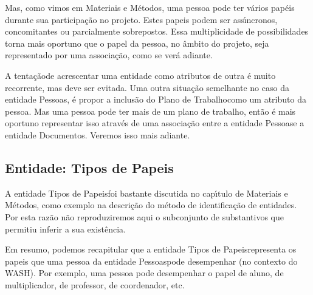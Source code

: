 \documentclass[
12pt,		%
openright,	%
twoside,  %
a4paper,			%
chapter=TITLE,		%
english,			%
french,				%
spanish,			%
brazil				%
]{USPSC-classe/USPSC}
\begin{document}
Mas, como vimos em Materiais e M\'etodos, uma pessoa pode ter v\'arios pap\'eis durante sua participa\c{c}\~ao no projeto. Estes papeis podem ser ass\'{\i}ncronos, concomitantes ou parcialmente sobrepostos. Essa multiplicidade de possibilidades torna mais oportuno que  o papel da pessoa, no \^ambito do projeto, seja representado por uma associa\c{c}\~ao, como se ver\'a adiante.














A \textquotedbl tenta\c{c}\~ao\textquotedbl  de acrescentar uma entidade como atributos de outra \'e muito recorrente, mas deve ser evitada. Uma outra situa\c{c}\~ao semelhante no caso da entidade \textquotedbl Pessoas\textquotedbl , \'e propor a inclus\~ao do \textquotedbl Plano de Trabalho\textquotedbl  como um atributo da pessoa. Mas uma pessoa pode ter mais de um plano de trabalho, ent\~ao \'e mais oportuno representar isso atrav\'es de uma associa\c{c}\~ao entre a entidade \textquotedbl Pessoas\textquotedbl  e a entidade \textquotedbl Documentos\textquotedbl . Veremos isso mais adiante.














\subsection[Entidade: Tipos de Papeis]{Entidade: Tipos de Papeis}\label{Entidade: Tipos de Papeis}
A entidade \textquotedbl Tipos de Papeis\textquotedbl  foi bastante discutida no cap\'{\i}tulo de Materiais e M\'etodos, como exemplo na descri\c{c}\~ao do m\'etodo de identifica\c{c}\~ao de entidades. Por esta raz\~ao n\~ao reproduziremos aqui o subconjunto de substantivos que permitiu inferir a sua exist\^encia.














Em resumo, podemos recapitular que a entidade \textquotedbl Tipos de Papeis\textquotedbl  representa os papeis que uma pessoa da entidade \textquotedbl Pessoas\textquotedbl  pode desempenhar (no contexto do WASH). Por exemplo, uma pessoa pode desempenhar o papel de aluno, de multiplicador, de professor, de coordenador, etc.
\end{document}
